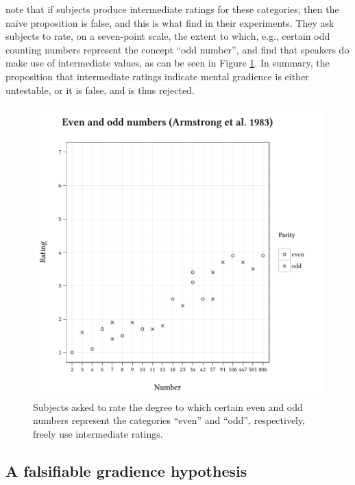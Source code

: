 \citeauthor{Armstrong1983} note that if subjects produce intermediate ratings for these categories, then the naïve proposition is false, and this is what \citeauthor{Armstrong1983} find in their experiments. They ask subjects to rate, on a seven-point scale, the extent to which, e.g., certain odd counting numbers represent the concept ``odd number'', and find that speakers do make use of intermediate values, as can be seen in Figure \ref{agg}. In summary, the proposition that intermediate ratings indicate mental gradience is either untestable, or it is false, and is thus rejected.

\begin{figure} \centering
\includegraphics{agg.pdf}
\caption{Subjects asked to rate the degree to which certain even and odd numbers represent the categories ``even'' and ``odd'', respectively, freely use intermediate ratings.}
\label{agg} 
\end{figure}

\subsection{A falsifiable gradience hypothesis}

